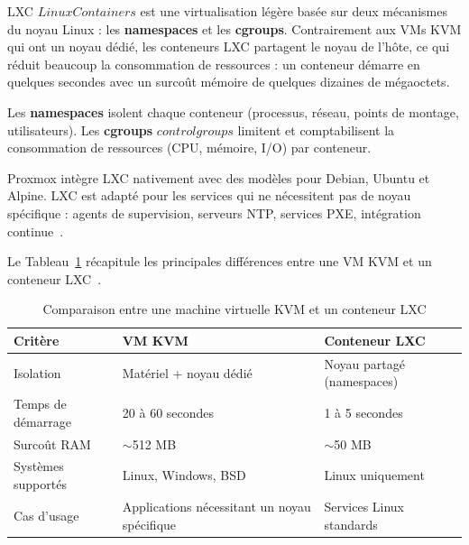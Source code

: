 
\par LXC \(Linux Containers\) est une virtualisation légère basée sur deux mécanismes du noyau Linux : les \textbf{namespaces} et les \textbf{cgroups}. Contrairement aux VMs KVM qui ont un noyau dédié, les conteneurs LXC partagent le noyau de l'hôte, ce qui réduit beaucoup la consommation de ressources : un conteneur démarre en quelques secondes avec un surcoût mémoire de quelques dizaines de mégaoctets.\\

\par Les \textbf{namespaces} isolent chaque conteneur (processus, réseau, points de montage, utilisateurs). Les \textbf{cgroups} \(control groups\) limitent et comptabilisent la consommation de ressources (CPU, mémoire, I/O) par conteneur.\\

\par Proxmox intègre LXC nativement avec des modèles pour Debian, Ubuntu et Alpine. LXC est adapté pour les services qui ne nécessitent pas de noyau spécifique : agents de supervision, serveurs NTP, services PXE, intégration continue~\cite{ref39}.\\

\par Le Tableau~\ref{tab:vm-vs-lxc} récapitule les principales différences entre une VM KVM et un conteneur LXC~\cite{ref39}.\\

\begin{table}[H]
\centering
\caption{Comparaison entre une machine virtuelle KVM et un conteneur LXC}
\label{tab:vm-vs-lxc}
\begin{tabular}{|p{4cm}|p{4cm}|p{4cm}|}
\hline
\textbf{Critère} & \textbf{VM KVM} & \textbf{Conteneur LXC} \\
\hline
Isolation & Matériel + noyau dédié & Noyau partagé (namespaces) \\
\hline
Temps de démarrage & 20 à 60 secondes & 1 à 5 secondes \\
\hline
Surcoût RAM & $\sim$512 MB & $\sim$50 MB \\
\hline
Systèmes supportés & Linux, Windows, BSD & Linux uniquement \\
\hline
Cas d'usage & Applications nécessitant un noyau spécifique & Services Linux standards \\
\hline
\end{tabular}
\end{table}

